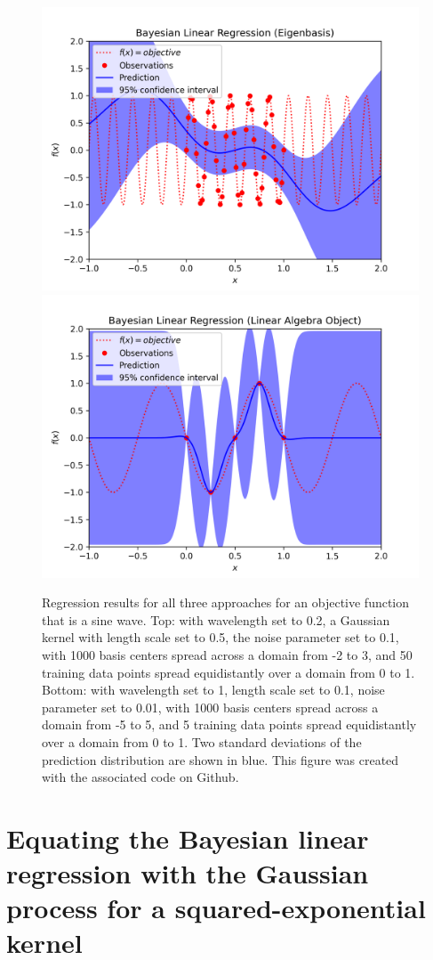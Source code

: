 \documentclass{article}
\begin{document}
\begin{figure}
    \begin{center}
    \includegraphics[width=0.75\linewidth]{regression_results}
    \includegraphics[width=0.75\linewidth]{regression_results2}
    \caption{Regression results for all three approaches for an objective function that is a sine wave. Top: with wavelength set to 0.2, a Gaussian kernel with length scale set to 0.5, the noise parameter set to 0.1, with 1000 basis centers spread across a domain from -2 to 3, and 50 training data points spread equidistantly over a domain from 0 to 1. Bottom: with wavelength set to 1, length scale set to 0.1, noise parameter set to 0.01, with 1000 basis centers spread across a domain from -5 to 5, and 5 training data points spread equidistantly over a domain from 0 to 1. Two standard deviations of the prediction distribution are shown in blue. This figure was created with the associated code on Github.}
    \label{fig:example_regression}
    \end{center}
\end{figure}

\section{Equating the Bayesian linear regression with the Gaussian process for a squared-exponential kernel}
\end{document}

